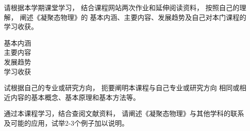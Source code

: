 \documentclass{article}
\begin{document}
\pagestyle{fancy}
\lhead{}
\rhead{}

\noindent
请根据本学期课堂学习，
结合课程网站两次作业和延伸阅读资料，
按照自己的理解，
阐述《凝聚态物理》的
基本内涵、主要内容、发展趋势及自己对本门课程的学习收获。

\begin{description}
    \item[基本内涵]
    \item[主要内容] 
    \item[发展趋势]
    \item[学习收获]  
\end{description}

\noindent
试根据自己的专业或研究方向，
扼要阐明本课程与自己专业或研究方向
相同或相近内容的基本概念、基本原理和基本方法等。

\noindent
通过本课程学习，结合查阅文献资料，
请阐述《凝聚态物理》与其他学科的联系
及可能的应用，试举2-3个例子加以说明。
\end{document}
